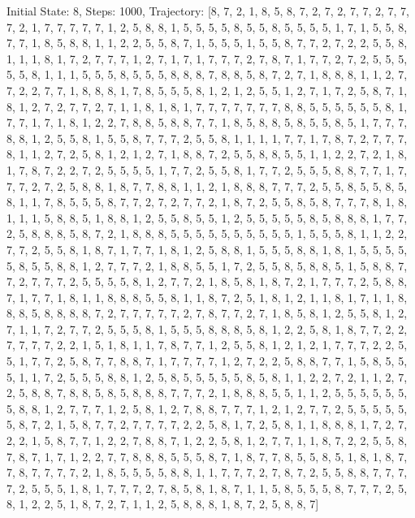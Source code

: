 \documentclass[12pt]{spbstu-task}
\begin{document}
{Initial State: 8, Steps: 1000, Trajectory: [8, 7, 2, 1, 8, 5, 8, 7, 2, 7, 2, 7, 7, 2, 7, 7, 7, 2, 1, 7, 7, 7, 7, 7, 1, 2, 5, 8, 8, 1, 5, 5, 5, 5, 8, 5, 5, 8, 5, 5, 5, 5, 1, 7, 1, 5, 5, 8, 7, 7, 1, 8, 5, 8, 8, 1, 1, 2, 2, 5, 5, 8, 7, 1, 5, 5, 5, 1, 5, 5, 8, 7, 7, 2, 7, 2, 2, 5, 5, 8, 1, 1, 1, 8, 1, 7, 2, 7, 7, 7, 1, 2, 7, 1, 7, 1, 7, 7, 7, 2, 7, 8, 7, 1, 7, 7, 2, 7, 2, 5, 5, 5, 5, 5, 8, 1, 1, 1, 5, 5, 5, 8, 5, 5, 5, 8, 8, 8, 7, 8, 8, 5, 8, 7, 2, 7, 1, 8, 8, 8, 1, 1, 2, 7, 7, 2, 2, 7, 7, 1, 8, 8, 8, 1, 7, 8, 5, 5, 5, 8, 1, 2, 1, 2, 5, 5, 1, 2, 7, 1, 7, 2, 5, 8, 7, 1, 8, 1, 2, 7, 2, 7, 7, 2, 7, 1, 1, 8, 1, 8, 1, 7, 7, 7, 7, 7, 7, 7, 8, 8, 5, 5, 5, 5, 5, 5, 8, 1, 7, 7, 1, 7, 1, 8, 1, 2, 2, 7, 8, 8, 5, 8, 8, 7, 7, 1, 8, 5, 8, 8, 5, 8, 5, 5, 8, 5, 1, 7, 7, 7, 8, 8, 1, 2, 5, 5, 8, 1, 5, 5, 8, 7, 7, 7, 2, 5, 5, 8, 1, 1, 1, 1, 7, 7, 1, 7, 8, 7, 2, 7, 7, 7, 8, 1, 1, 2, 7, 2, 5, 8, 1, 2, 1, 2, 7, 1, 8, 8, 7, 2, 5, 5, 8, 8, 5, 5, 1, 1, 2, 2, 7, 2, 1, 8, 1, 7, 8, 7, 2, 2, 7, 2, 5, 5, 5, 5, 1, 7, 7, 2, 5, 5, 8, 1, 7, 7, 2, 5, 5, 5, 8, 8, 7, 7, 1, 7, 7, 7, 2, 7, 2, 5, 8, 8, 1, 8, 7, 7, 8, 8, 1, 1, 2, 1, 8, 8, 8, 7, 7, 7, 2, 5, 5, 8, 5, 5, 8, 5, 8, 1, 1, 7, 8, 5, 5, 5, 8, 7, 7, 2, 7, 2, 7, 7, 2, 1, 8, 7, 2, 5, 5, 8, 5, 8, 7, 7, 7, 8, 1, 8, 1, 1, 1, 5, 8, 8, 5, 1, 8, 8, 1, 2, 5, 5, 8, 5, 5, 1, 2, 5, 5, 5, 5, 5, 8, 5, 8, 8, 8, 1, 7, 7, 2, 5, 8, 8, 8, 5, 8, 7, 2, 1, 8, 8, 8, 5, 5, 5, 5, 5, 5, 5, 5, 5, 5, 1, 5, 5, 5, 8, 1, 1, 2, 2, 7, 7, 2, 5, 5, 8, 1, 8, 7, 1, 7, 7, 1, 8, 1, 2, 5, 8, 8, 1, 5, 5, 5, 8, 8, 1, 8, 1, 5, 5, 5, 5, 5, 8, 5, 5, 8, 8, 1, 2, 7, 7, 7, 2, 1, 8, 8, 5, 5, 1, 7, 2, 5, 5, 8, 5, 8, 8, 5, 1, 5, 8, 8, 7, 7, 2, 7, 7, 7, 2, 5, 5, 5, 5, 8, 1, 2, 7, 7, 2, 1, 8, 5, 8, 1, 8, 7, 2, 1, 7, 7, 7, 2, 5, 8, 8, 7, 1, 7, 7, 1, 8, 1, 1, 8, 8, 8, 5, 5, 8, 1, 1, 8, 7, 2, 5, 1, 8, 1, 2, 1, 1, 8, 1, 7, 1, 1, 8, 8, 8, 5, 8, 8, 8, 8, 7, 2, 7, 7, 7, 7, 7, 2, 7, 8, 7, 7, 2, 7, 1, 8, 5, 8, 1, 2, 5, 5, 8, 1, 2, 7, 1, 1, 7, 2, 7, 7, 2, 5, 5, 5, 8, 1, 5, 5, 5, 8, 8, 8, 5, 8, 1, 2, 2, 5, 8, 1, 8, 7, 7, 2, 2, 7, 7, 7, 7, 2, 2, 1, 5, 1, 8, 1, 1, 7, 8, 7, 7, 1, 2, 5, 5, 8, 1, 2, 1, 2, 1, 7, 7, 7, 2, 2, 5, 5, 1, 7, 7, 2, 5, 8, 7, 7, 8, 8, 7, 1, 7, 7, 7, 7, 1, 2, 7, 2, 2, 5, 8, 8, 7, 7, 1, 5, 8, 5, 5, 5, 1, 1, 7, 2, 5, 5, 5, 8, 8, 1, 2, 5, 8, 5, 5, 5, 5, 5, 8, 5, 8, 1, 1, 2, 2, 7, 2, 1, 1, 2, 7, 2, 5, 8, 8, 7, 8, 8, 5, 8, 5, 8, 8, 8, 7, 7, 7, 2, 1, 8, 8, 8, 5, 5, 1, 1, 2, 5, 5, 5, 5, 5, 5, 5, 8, 8, 1, 2, 7, 7, 7, 1, 2, 5, 8, 1, 2, 7, 8, 8, 7, 7, 7, 1, 2, 1, 2, 7, 7, 2, 5, 5, 5, 5, 5, 5, 8, 7, 2, 1, 5, 8, 7, 7, 2, 7, 7, 7, 7, 2, 2, 5, 8, 1, 7, 2, 5, 8, 1, 1, 8, 8, 8, 1, 7, 2, 7, 2, 2, 1, 5, 8, 7, 7, 1, 2, 2, 7, 8, 8, 7, 1, 2, 2, 5, 8, 1, 2, 7, 7, 1, 1, 8, 7, 2, 2, 5, 5, 8, 7, 8, 7, 1, 7, 1, 2, 2, 7, 7, 8, 8, 8, 5, 5, 5, 8, 7, 1, 8, 7, 7, 8, 5, 5, 8, 5, 1, 8, 1, 8, 7, 7, 8, 7, 7, 7, 7, 2, 1, 8, 5, 5, 5, 5, 8, 8, 1, 1, 7, 7, 7, 2, 7, 8, 7, 2, 5, 5, 8, 8, 7, 7, 7, 7, 2, 5, 5, 5, 1, 8, 1, 7, 7, 7, 2, 7, 8, 5, 8, 1, 8, 7, 1, 1, 5, 8, 5, 5, 5, 8, 7, 7, 7, 2, 5, 8, 1, 2, 2, 5, 1, 8, 7, 2, 7, 1, 1, 2, 5, 8, 8, 8, 1, 8, 7, 2, 5, 8, 8, 7]
\par}
\end{document}
